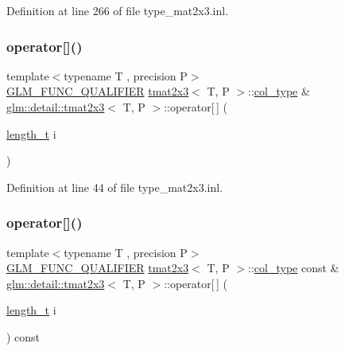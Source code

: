 Definition at line 266 of file type\+\_\+mat2x3.\+inl.

\mbox{\label{structglm_1_1detail_1_1tmat2x3_a68883354758d90780a8f45ecdef13ef9}} 
\subsubsection{\texorpdfstring{operator[]()}{operator[]()}\hspace{0.1cm}{\footnotesize\ttfamily [1/2]}}
{\footnotesize\ttfamily template$<$typename T , precision P$>$ \\
\hyperlink{setup_8hpp_a33fdea6f91c5f834105f7415e2a64407}{G\+L\+M\+\_\+\+F\+U\+N\+C\+\_\+\+Q\+U\+A\+L\+I\+F\+I\+ER} \hyperlink{structglm_1_1detail_1_1tmat2x3}{tmat2x3}$<$ T, P $>$\+::\hyperlink{structglm_1_1detail_1_1tmat2x3_aa68634b0c048f0010844a45aa5e9bdab}{col\+\_\+type} \& \hyperlink{structglm_1_1detail_1_1tmat2x3}{glm\+::detail\+::tmat2x3}$<$ T, P $>$\+::operator\mbox{[}$\,$\mbox{]} (\begin{DoxyParamCaption}\item[{\hyperlink{namespaceglm_a090a0de2260835bee80e71a702492ed9}{length\+\_\+t}}]{i }\end{DoxyParamCaption})}



Definition at line 44 of file type\+\_\+mat2x3.\+inl.

\mbox{\label{structglm_1_1detail_1_1tmat2x3_ae95f4927e7961322f81f5c1902b116db}} 
\subsubsection{\texorpdfstring{operator[]()}{operator[]()}\hspace{0.1cm}{\footnotesize\ttfamily [2/2]}}
{\footnotesize\ttfamily template$<$typename T , precision P$>$ \\
\hyperlink{setup_8hpp_a33fdea6f91c5f834105f7415e2a64407}{G\+L\+M\+\_\+\+F\+U\+N\+C\+\_\+\+Q\+U\+A\+L\+I\+F\+I\+ER} \hyperlink{structglm_1_1detail_1_1tmat2x3}{tmat2x3}$<$ T, P $>$\+::\hyperlink{structglm_1_1detail_1_1tmat2x3_aa68634b0c048f0010844a45aa5e9bdab}{col\+\_\+type} const  \& \hyperlink{structglm_1_1detail_1_1tmat2x3}{glm\+::detail\+::tmat2x3}$<$ T, P $>$\+::operator\mbox{[}$\,$\mbox{]} (\begin{DoxyParamCaption}\item[{\hyperlink{namespaceglm_a090a0de2260835bee80e71a702492ed9}{length\+\_\+t}}]{i }\end{DoxyParamCaption}) const}



